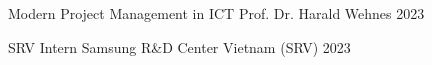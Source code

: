 

\begin{cvhonors}

  \cvhonor
    {Modern Project Management in ICT} %
    {Prof. Dr. Harald Wehnes} %
    {} %
    {2023} %

  \cvhonor
    {SRV Intern} %
    {Samsung R\&D Center Vietnam (SRV)} %
    {} %
    {2023} %

\end{cvhonors}
